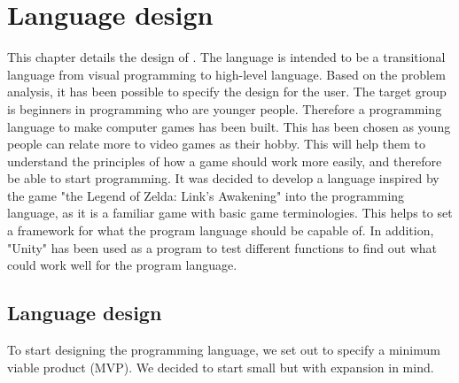 \chapter{Language design}
This chapter details the design of \dazel.
The language is intended to be a transitional language from visual programming to high-level language. Based on the problem analysis, it has been possible to specify the design for the user.
The target group is beginners in programming who are younger people. Therefore a programming language to make computer games has been built. This has been chosen as young people can relate more to video games as their hobby. 
This will help them to understand the principles of how a game should work more easily, and therefore be able to start programming. 
It was decided to develop a language inspired by the game "the Legend of Zelda: Link’s Awakening" into the programming language, as it is a familiar game with basic game terminologies.
This helps to set a framework for what the program language should be capable of.
In addition, "Unity" has been used as a program to test different functions to find out what could work well for the program language.



\section{Language design}

To start designing the programming language, we set out to specify a minimum viable product (MVP). We decided to start small but with expansion in mind.











